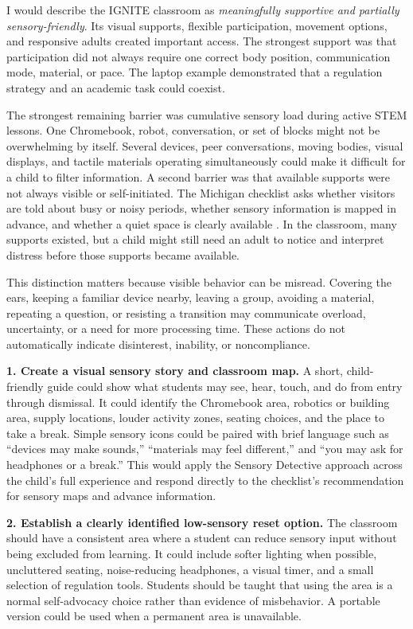 \documentclass[11pt]{article}
\newcommand{\reviewsection}[1]{\vspace{0.07in}\noindent{\normalsize\bfseries\color{PrimaryRed}#1}\par\vspace{0.02in}}
\begin{document}
I would describe the IGNITE classroom as \textit{meaningfully supportive and partially sensory-friendly}. Its visual supports, flexible participation, movement options, and responsive adults created important access. The strongest support was that participation did not always require one correct body position, communication mode, material, or pace. The laptop example demonstrated that a regulation strategy and an academic task could coexist.

The strongest remaining barrier was cumulative sensory load during active STEM lessons. One Chromebook, robot, conversation, or set of blocks might not be overwhelming by itself. Several devices, peer conversations, moving bodies, visual displays, and tactile materials operating simultaneously could make it difficult for a child to filter information. A second barrier was that available supports were not always visible or self-initiated. The Michigan checklist asks whether visitors are told about busy or noisy periods, whether sensory information is mapped in advance, and whether a quiet space is clearly available \citep{mddi_checklist}. In the classroom, many supports existed, but a child might still need an adult to notice and interpret distress before those supports became available.

This distinction matters because visible behavior can be misread. Covering the ears, keeping a familiar device nearby, leaving a group, avoiding a material, repeating a question, or resisting a transition may communicate overload, uncertainty, or a need for more processing time. These actions do not automatically indicate disinterest, inability, or noncompliance.

\reviewsection{Recommendations}

\textbf{1. Create a visual sensory story and classroom map.} A short, child-friendly guide could show what students may see, hear, touch, and do from entry through dismissal. It could identify the Chromebook area, robotics or building area, supply locations, louder activity zones, seating choices, and the place to take a break. Simple sensory icons could be paired with brief language such as ``devices may make sounds,'' ``materials may feel different,'' and ``you may ask for headphones or a break.'' This would apply the Sensory Detective approach across the child's full experience and respond directly to the checklist's recommendation for sensory maps and advance information.

\textbf{2. Establish a clearly identified low-sensory reset option.} The classroom should have a consistent area where a student can reduce sensory input without being excluded from learning. It could include softer lighting when possible, uncluttered seating, noise-reducing headphones, a visual timer, and a small selection of regulation tools. Students should be taught that using the area is a normal self-advocacy choice rather than evidence of misbehavior. A portable version could be used when a permanent area is unavailable.
\end{document}
